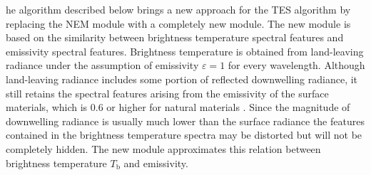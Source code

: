 he algorithm described below brings a new approach for the TES algorithm by replacing the NEM module with a completely new module. The new module is based on the similarity between brightness temperature spectral features and emissivity spectral features. Brightness temperature is obtained from land-leaving radiance under the assumption of emissivity $\varepsilon=1$ for every wavelength. Although land-leaving radiance includes some portion of reflected downwelling radiance, it still retains the spectral features arising from the emissivity of the surface materials, which is $0.6$ or higher for natural materials \cite{GR98}. Since the magnitude of downwelling radiance is usually much lower than the surface radiance the features contained in the brightness temperature spectra may be distorted but will not be completely hidden. The new module approximates this relation between brightness temperature $T_\mathrm{b}$ and emissivity.

